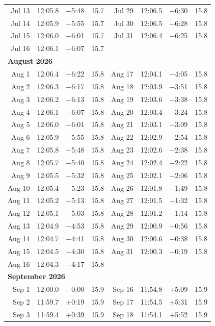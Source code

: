{\begin{longtable}{r r r r | r r r r}
Jul 13 & 12:05.8 & $-$5:48 & 15.7 & Jul 29 & 12:06.5 & $-$6:30 & 15.8 \\
Jul 14 & 12:05.9 & $-$5:55 & 15.7 & Jul 30 & 12:06.5 & $-$6:28 & 15.8 \\
Jul 15 & 12:06.0 & $-$6:01 & 15.7 & Jul 31 & 12:06.4 & $-$6:25 & 15.8 \\
Jul 16 & 12:06.1 & $-$6:07 & 15.7 &  & & &  \\
\multicolumn{8}{l}{\textbf{August 2026}}\\
Aug 1 & 12:06.4 & $-$6:22 & 15.8 & Aug 17 & 12:04.1 & $-$4:05 & 15.8 \\
Aug 2 & 12:06.3 & $-$6:17 & 15.8 & Aug 18 & 12:03.9 & $-$3:51 & 15.8 \\
Aug 3 & 12:06.2 & $-$6:13 & 15.8 & Aug 19 & 12:03.6 & $-$3:38 & 15.8 \\
Aug 4 & 12:06.1 & $-$6:07 & 15.8 & Aug 20 & 12:03.4 & $-$3:24 & 15.8 \\
Aug 5 & 12:06.0 & $-$6:01 & 15.8 & Aug 21 & 12:03.1 & $-$3:09 & 15.8 \\
Aug 6 & 12:05.9 & $-$5:55 & 15.8 & Aug 22 & 12:02.9 & $-$2:54 & 15.8 \\
Aug 7 & 12:05.8 & $-$5:48 & 15.8 & Aug 23 & 12:02.6 & $-$2:38 & 15.8 \\
Aug 8 & 12:05.7 & $-$5:40 & 15.8 & Aug 24 & 12:02.4 & $-$2:22 & 15.8 \\
Aug 9 & 12:05.5 & $-$5:32 & 15.8 & Aug 25 & 12:02.1 & $-$2:06 & 15.8 \\
Aug 10 & 12:05.4 & $-$5:23 & 15.8 & Aug 26 & 12:01.8 & $-$1:49 & 15.8 \\
Aug 11 & 12:05.2 & $-$5:13 & 15.8 & Aug 27 & 12:01.5 & $-$1:32 & 15.8 \\
Aug 12 & 12:05.1 & $-$5:03 & 15.8 & Aug 28 & 12:01.2 & $-$1:14 & 15.8 \\
Aug 13 & 12:04.9 & $-$4:53 & 15.8 & Aug 29 & 12:00.9 & $-$0:56 & 15.8 \\
Aug 14 & 12:04.7 & $-$4:41 & 15.8 & Aug 30 & 12:00.6 & $-$0:38 & 15.8 \\
Aug 15 & 12:04.5 & $-$4:30 & 15.8 & Aug 31 & 12:00.3 & $-$0:19 & 15.8 \\
Aug 16 & 12:04.3 & $-$4:17 & 15.8 &  & & &  \\
\multicolumn{8}{l}{\textbf{September 2026}}\\
Sep 1 & 12:00.0 & $-$0:00 & 15.9 & Sep 16 & 11:54.8 & +5:09 & 15.9 \\
Sep 2 & 11:59.7 & +0:19 & 15.9 & Sep 17 & 11:54.5 & +5:31 & 15.9 \\
Sep 3 & 11:59.4 & +0:39 & 15.9 & Sep 18 & 11:54.1 & +5:52 & 15.9 \\

\end{longtable}}
